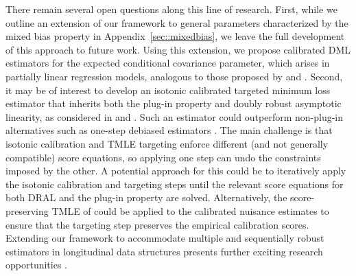 \documentclass[11pt]{article}
\theoremstyle{plain}
\begin{document}
There remain several open questions along this line of research. First, while we outline an extension of our framework to general parameters characterized by the mixed bias property \citep{rotnitzky2021characterization} in Appendix~\ref{sec::mixedbias}, we leave the full development of this approach to future work. Using this extension, we propose calibrated DML estimators for the expected conditional covariance parameter, which arises in partially linear regression models, analogous to those proposed by \cite{dukes2024doubly} and \cite{bonvini2024doubly}. Second, it may be of interest to develop an isotonic calibrated targeted minimum loss estimator that inherits both the plug-in property and doubly robust asymptotic linearity, as considered in \cite{van2014targeted} and \cite{benkeser2017doubly}. Such an estimator could outperform non-plug-in alternatives such as one-step debiased estimators \citep{porter2011relative}. {\color{purple}The main challenge is that isotonic calibration and TMLE targeting enforce different (and not generally compatible) score equations, so applying one step can undo the constraints imposed by the other.} A potential approach for this could be to iteratively apply the isotonic calibration and targeting steps until the relevant score equations for both DRAL and the plug-in property are solved. Alternatively, the score-preserving TMLE of \cite{pimentel2025score} could be applied to the calibrated nuisance estimates to ensure that the targeting step preserves the empirical calibration scores. Extending our framework to accommodate multiple and sequentially robust estimators in longitudinal data structures presents further exciting research opportunities \citep{rotnitzky2017multiply, luedtke2017sequential}.
\end{document}
